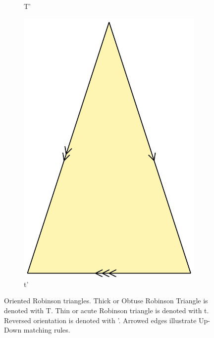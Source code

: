 \documentclass[
  oneside,
  11pt, a4paper,
  footinclude=true,
  headinclude=true,
  cleardoublepage=empty
]{scrbook}
\begin{document}
\begin{figure}[H]
        \begin{subfigure}[t]{0.4\textwidth}
                \caption*{\Large T'}
        \end{subfigure}\hfill
        \begin{subfigure}[t]{0.3\textwidth}
                \includegraphics[width=\textwidth]{T'SRob}
                \caption*{\Large t'}
        \end{subfigure}  
        \caption[Oriented Robinson Triangles]{Oriented Robinson triangles. Thick or Obtuse Robinson Triangle is denoted with T. Thin or acute Robinson triangle is denoted with t. Reversed orientation is denoted with '. Arrowed edges illustrate Up-Down matching rules.}  
        \label{fig:OrientedRob}                    
\end{figure}
\end{document}
